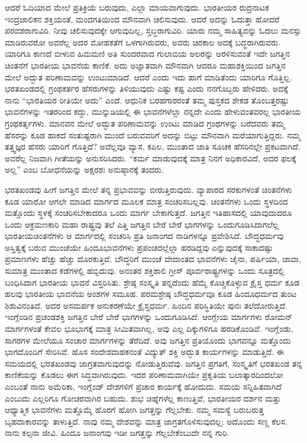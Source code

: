 ಆದರೆ ಓದಿಯಾದ ಮೇಲೆ ಪ್ರತಿಕ್ರಿಯೆ ಬರುವುದು, ಎಲ್ಲಾ ಮಾಯವಾಗುವುದು. ಭಾರತೀಯರ ರುದ್ರನಾಟಕ ಇಂದ್ರಜಾಲಿಕನ ಶಕ್ತಿಯಂತೆ, ಮಂದಗತಿಯಿಂದ ಮೌನವಾಗಿ ಚಲಿಸುವುದು. ಆದರೆ ಅದನ್ನು ಓದುತ್ತಾ ಹೋದರೆ ಪರವಶರಾಗುವಿರಿ. ನೀವು ಚಲಿಸುವುದಕ್ಕೇ ಆಗುವುದಿಲ್ಲ, ಸ್ತಬ್ಧರಾಗುವಿರಿ. ಯಾರು ನಮ್ಮ ಸಾಹಿತ್ಯವನ್ನು ಓದಲು ಮನಸ್ಸು ಮಾಡಿರುವರೋ ಅವರೆಲ್ಲ ಅದರ ಮೋಹಕತೆಗೆ ಒಳಗಾಗಿರುವರು, ಅವರು ಚಿರಕಾಲ ಅದಕ್ಕೆ ಬದ್ಧರಾಗಿರುವರು. ಯಾರಿಗೂ ಕಾಣದೆ ಬೀಳುವ ಹಿಮಮಣಿ ಅತಿ ಸುಂದರವಾದ ಗುಲಾಬಿಯ ಅಲರನ್ನು ಅರಳಿಸುವಂತೆ ಇದೇ ಜಗತ್ತಿನ ಚಿಂತನೆಗೆ ಭಾರತೀಯ ಭಾವನೆಯ ಕಾಣಿಕೆ. ಅದು ಅಜ್ಞಾತವಾಗಿ ಮೌನವಾಗಿ ಆದರೂ ಮಹಾಶಕ್ತಿಯಿಂದ ಜಗತ್ತಿನ ಮೇಲೆ ಅದ್ಭುತ ಪರಿಣಾಮವನ್ನು ಉಂಟುಮಾಡಿದೆ. ಆದರೆ ಎಂದು ಇದು ಹಾಗೆ ಮಾಡಿತೆಂದು ಯಾರಿಗೂ ಗೊತ್ತಿಲ್ಲ. ಭರತಖಂಡದಲ್ಲಿ ಗ್ರಂಥಕರ್ತರ ಹೆಸರುಗಳನ್ನು ತಿಳಿಯುವುದು ಎಷ್ಟು ಕಷ್ಟ ಎಂದು ನನಗೊಬ್ಬರು ಹೇಳಿದರು. ಅದಕ್ಕೆ ನಾನು “ಭಾರತಿಯರ ರೀತಿಯೇ ಅದು” ಎಂದೆ. ಆಧುನಿಕ ಬರಹಗಾರರಂತೆ ತಮ್ಮ ಪುಸ್ತಕದ ಶೇಕಡ ತೊಂಬತ್ತರಷ್ಟು ಭಾವನೆಗಳನ್ನು ಇತರರಿಂದ ಕದ್ದು, ಮುನ್ನುಡಿಯಲ್ಲಿ ಈ ಭಾವನೆಗಳೆಲ್ಲಾ ನನ್ನದೇ ಎಂದು ಹೇಳುವಂತವರಲ್ಲ ಭಾರತೀಯ ಗ್ರಂಥಕರ್ತೃಗಳು. ಮಾನವನ ಮೇಲೆ ಅದ್ಭುತ ಪರಿಣಾಮವನ್ನು ಉಂಟು ಮಾಡಿದ ಗ್ರಂಥಗಳನ್ನು ಬರೆದವರು ತಮ್ಮ ಹೆಸರನ್ನು ಕೂಡ ಹಾಕದೆ ಸಂತುಷ್ಟರಾಗಿ ಮುಂದೆ ಬರುವವರಿಗೆ ಅದನ್ನು ಬಿಟ್ಟು ಮೌನವಾಗಿ ಮರೆಯಾಗುತ್ತಿದ್ದರು. ನಮ್ಮ ತತ್ತ್ವಜ್ಞರ ಹೆಸರು ಯಾರಿಗೆ ಗೊತ್ತಿದೆ? ಅವೆಲ್ಲವೂ ವ್ಯಾಸ, ಕಪಿಲ, ಮುಂತಾದ ಜಾತಿ ಸೂಚಕ ಹೆಸರಿನಲ್ಲೇ ಪ್ರಕಟವಾಗಿದೆ. ಅವರೆಲ್ಲ ನಿಜವಾಗಿ ಗೀತೆಯನ್ನು ಅನುಸರಿಸಿದರು. “ಕರ್ಮ ಮಾಡುವುದಕ್ಕೆ ಮಾತ್ರ ನಿನಗೆ ಅಧಿಕಾರವಿದೆ, ಅದರ ಫಲಕ್ಕೆ ಅಲ್ಲ” ಎಂಬ ಬೋಧನೆಯನ್ನು ಅಕ್ಷರಶಃ ಅನುಷ್ಠಾನಕ್ಕೆ ತಂದರು.

ಭರತಖಂಡವು ಹೀಗೆ ಜಗತ್ತಿನ ಮೇಲೆ ತನ್ನ ಪ್ರಭಾವವನ್ನು ಬೀರುತ್ತಿರುವುದು. ವ್ಯಾಪಾರದ ಸರಕುಗಳಂತೆ ಚಿಂತನೆಗಳು ಕೂಡ ಯಾರೋ ಆಗಲೇ ಮಾಡಿದ ಮಾರ್ಗದ ಮೂಲಕ ಮಾತ್ರ ಸಂಚರಿಸಬಲ್ಲವು. ಚಿಂತನೆಗಳು ಒಂದು ಸ್ಥಳದಿಂದ ಮತ್ತೊಂದು ಸ್ಥಳಕ್ಕೆ ಸಂಚರಿಸಬೇಕಾದರೂ ಒಂದು ಮಾರ್ಗ ಬೇಕಾಗುತ್ತದೆ. ಜಗತ್ತಿನ ಇತಿಹಾಸದಲ್ಲಿ ಯಾವುದಾದರೂ ಒಂದು ಆಕ್ರಮಣಕಾರಿ ಮಹಾ ರಾಷ್ಟ್ರವು ತಲೆ ಎತ್ತಿ ಜಗತ್ತಿನ ಬೇರೆ ಬೇರೆ ಭಾಗಗಳನ್ನು ಒಂದುಗೂಡಿಸಿದಾಗಲೆಲ್ಲ ಭಾರತೀಯ\break ಚಿಂತನೆಗಳು ಆ ಮಾರ್ಗದಲ್ಲಿ ಸಂಚರಿಸಿ ಪ್ರತಿ ಜನಾಂಗದ ನಾಡಿಗಳನ್ನೂ ಪ್ರವೇಶಿಸಿದೆ. ಬೌದ್ಧಧರ್ಮವು ಅಸ್ತಿತ್ವಕ್ಕೆ ಬರುವ ಮುಂಚೆಯೇ ಹಿಂದೂಭಾವನೆಗಳು ಪ್ರಪಂಚದಲ್ಲೆಲ್ಲಾ ಹರಡಿದ್ದವು ಎನ್ನುವುದಕ್ಕೆ ಸಾಕಾದಷ್ಟು ಪ್ರಮಾಣಗಳು ಹೆಚ್ಚು ಹೆಚ್ಚು ದೊರಕುತ್ತಿವೆ. ಬೌದ್ಧರಿಗೆ ಮುಂಚೆ ವೇದಾಂತದ ಭಾವನೆಗಳು ಚೈನಾ, ಪರ್ಷಿಯಾ, ಜಾವಾ, ಸುಮಾತ್ರ ಮುಂತಾದ ಕಡೆಗಳಲ್ಲಿ ಹಬ್ಬಿದುವು. ಅನಂತರ ಶಕ್ತಿಶಾಲಿ ಗ್ರೀಸ್​ ಪೂರ್ವರಾಷ್ಟ್ರಗಳನ್ನು ಒಂದು ಸೂತ್ರದಲ್ಲಿ ಬಂಧಿಸಿದಾಗ ಭಾರತೀಯ ಭಾವನೆ ವಿಸ್ತರಿಸಿತು. ಶ್ರೇಷ್ಠ ಸಂಸ್ಕೃತಿ ತನ್ನದೆಂದು ಹೆಮ್ಮೆ ಕೊಚ್ಚಿಕೊಳ್ಳುವ ಕ್ರೈಸ್ತ ಧರ್ಮ ಕೂಡ ಹಲವು ಭಾರತೀಯ ಭಾವನೆಯ ಅಂಶಗಳ ಸಮೂಹ. ಪರಮಶ್ರೇಷ್ಠ ಬೌದ್ಧಧರ್ಮವೂ ಕೂಡ ಹಿಂದೂಧರ್ಮದ ತುಂಟ ಶಿಶುವಿನಂತಿದೆ. ಅದರ ಅಸಮರ್ಪಕ ಅನುಕರಣೆಯೇ ಕ್ರೈಸ್ತಧರ್ಮ. ಹಿಂದಿನ ಪರಿಸ್ಥಿತಿಯೇ ಪುನಃ ತಲೆದೋರುತ್ತಿದೆ. ಇಂಗ್ಲೆಂಡಿನ ಪ್ರಚಂಡಶಕ್ತಿ ಜಗತ್ತಿನ ಬೇರೆ ಬೇರೆ ಭಾಗಗಳನ್ನು ಒಂದುಗೂಡಿಸಿದೆ. ಆಂಗ್ಲೇಯ ಮಾರ್ಗಗಳು ರೋಮನ್​ ಮಾರ್ಗಗಳಂತೆ ಕೇವಲ ಭೂಭಾಗಕ್ಕೆ ಮಾತ್ರ ಸೀಮಿತವಾಗಿಲ್ಲ, ಅವು ಎಲ್ಲ ದಿಕ್ಕುಗಳಿಗೂ ಹರಡಿಕೊಂಡಿವೆ. ಇಂಗ್ಲೆಂಡು, ಸಾಗರಗಳ ಮೇಲೆಯೂ ಸಂಚಾರ ಮಾರ್ಗಗಳನ್ನು ತೆರೆದಿದೆ. ಅವು ಜಗತ್ತಿನ ಪ್ರತಿಯೊಂದು ಭಾಗವನ್ನೂ ಮತ್ತೊಂದು ಭಾಗದೊಂದಿಗೆ ಸೇರಿಸಿವೆ. ಹೊಸ ಸಂದೇಶವಾಹಕನಂತೆ ವಿದ್ಯುತ್​ ಶಕ್ತಿ ಅದ್ಭುತ ಕಾರ್ಯಗಳನ್ನು ಮಾಡುತ್ತಿದೆ. ಈ ಸಮಯದಲ್ಲಿ ಭರತಖಂಡವು ಜಾಗ್ರತವಾಗುವುದನ್ನು ನೋಡುತ್ತಿರುವೆವು. ಜಗತ್ತಿನ ಪ್ರಗತಿಗೆ, ಸಂಸ್ಕೃತಿಗೆ ಭರತಖಂಡ ತನ್ನ ಕಾಣಿಕೆಯನ್ನು ಕೊಡಲು ಈಗ ಸಿದ್ಧವಾಗಿರುವುದು. ಇದರ ಪರಿಣಾಮವಾಗಿಯೇ ಪ್ರಕೃತಿಯ ಬಲಾತ್ಕಾರದಿಂದಲೋ ಎಂಬಂತೆ ನಾನು ಅಮೆರಿಕಾ, ಇಂಗ್ಲೆಂಡ್​ ದೇಶಗಳಿಗೆ ಪ್ರಚಾರ ಕಾರ್ಯಕ್ಕೆ ಹೋದುದು. ಸಮಯ ಸನ್ನಿಹಿತವಾಗಿದೆ ಎಂಬುದು ಎಲ್ಲರಿಗೂ ಗೋಚರವಾಗಿರ ಬಹುದು. ಶುಭ ಚಿಹ್ನೆಗಳೆಲ್ಲ ಕಾಣುತ್ತಿವೆ, ಭಾರತೀಯರ ದರ್ಶನ ಮತ್ತು ಆಧ್ಯಾತ್ಮಿಕ ಭಾವನೆಗಳು ಮತ್ತೊಮ್ಮೆ ಹೊರಗೆ ಹೋಗಿ ಜಗತ್ತನ್ನು ಗೆಲ್ಲಬೇಕು. ನಮ್ಮ ಸಮಸ್ಯೆ ಬರುಬರುತ್ತ ಬೃಹದಾಕಾರವನ್ನು ತಾಳುತ್ತಿದೆ. ನಾವು ನಮ್ಮ ದೇಶವನ್ನು ಮಾತ್ರ ಜಾಗ್ರತಗೊಳಿಸುವುದಲ್ಲ; ಅದೊಂದು ಸಣ್ಣ ಕೆಲಸ. ನಾನು ಕಲ್ಪನಾ ಜೀವಿ. ಹಿಂದೂ ಜನಾಂಗವು ಇಡೀ ಜಗತ್ತನ್ನು ಗೆಲ್ಲಬೇಕೆಂಬುದೇ ನನ್ನ ಗುರಿ.

